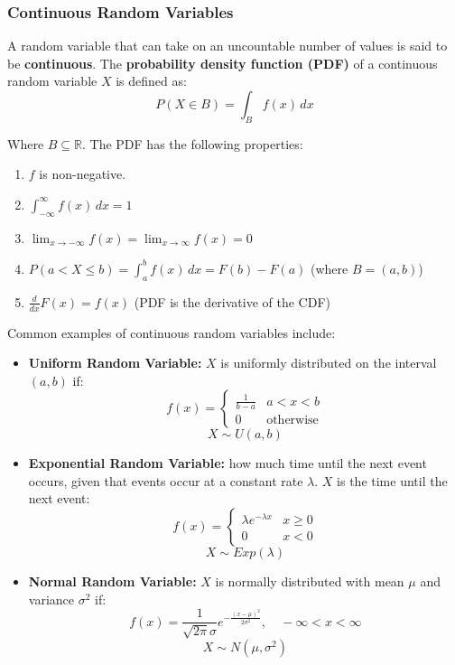 \documentclass[12pt]{article}
\begin{document}
\subsubsection{Continuous Random Variables}
A random variable that can take on an uncountable number of values is said to be \textbf{continuous}.
The \textbf{probability density function (PDF)} of a continuous random variable $X$ is defined as:
\[ P(X \in B) = \int_{B} f(x) \,dx \]

\noindent
Where $B \subseteq \mathbb{R}$.
The PDF has the following properties:

\begin{enumerate}
    \item $f$ is non-negative.
    \item $\int_{-\infty}^{\infty} f(x) \,dx = 1$
    \item $\lim_{x \to -\infty} f(x) = \lim_{x \to \infty} f(x) = 0$
    \item $P(a < X \leq b) = \int_{a}^{b} f(x) \,dx = F(b) - F(a)$ \hfill (where $B = (a, b)$)
    \item $\frac{d}{dx}F(x) = f(x)$ \hfill (PDF is the derivative of the CDF)
\end{enumerate}

\newpage
\noindent
Common examples of continuous random variables include:

\begin{itemize}
    \item \textbf{Uniform Random Variable:} $X$ is uniformly distributed on the interval $(a, b)$ if:
    \[ f(x) = \begin{cases}
        \frac{1}{b - a} & a < x < b \\
        0 & \text{otherwise}
    \end{cases}\]
    \[ X \sim U(a, b) \]
    \item \textbf{Exponential Random Variable:} how much time until the next event occurs, given that events occur at a constant rate $\lambda$. $X$ is the time until the next event:
    \[ f(x) = \begin{cases}
        \lambda e^{-\lambda x} & x \geq 0 \\
        0 & x < 0
    \end{cases} \]
    \[ X \sim Exp(\lambda) \]
    \item \textbf{Normal Random Variable:} $X$ is normally distributed with mean $\mu$ and variance $\sigma^2$ if:
    \[ f(x) = \frac{1}{\sqrt{2\pi}\sigma}e^{-\frac{(x - \mu)^2}{2\sigma^2}}, \quad -\infty < x < \infty \]
    \[ X \sim N(\mu, \sigma^2) \]
\end{itemize}
\end{document}
